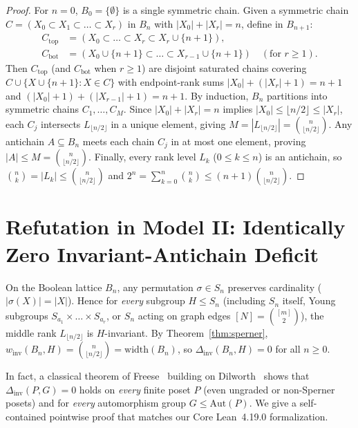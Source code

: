 \documentclass[11pt,a4paper]{article}
\theoremstyle{definition}
\newcommand{\Bn}{B_n}
\newcommand{\Sn}{S_n}
\newcommand{\Aut}{\mathrm{Aut}}
\newcommand{\width}{\mathrm{width}}
\newcommand{\winv}{w_{\mathrm{inv}}}
\newcommand{\Dinv}{\Delta_{\mathrm{inv}}}
\begin{document}
\begin{proof}
For $n = 0$, $B_0 = \{\emptyset\}$ is a single symmetric chain. Given a symmetric chain $C = (X_0 \subset X_1 \subset \dots \subset X_r)$ in $\Bn$ with $|X_0| + |X_r| = n$, define in $B_{n+1}$:
\begin{align*}
  C_{\mathrm{top}} &= (X_0 \subset \dots \subset X_r \subset X_r \cup \{n+1\}), \\
  C_{\mathrm{bot}} &= (X_0 \cup \{n+1\} \subset \dots \subset X_{r-1} \cup \{n+1\}) \quad (\text{for } r \ge 1).
\end{align*}
Then $C_{\mathrm{top}}$ (and $C_{\mathrm{bot}}$ when $r \ge 1$) are disjoint saturated chains covering $C \cup \{X \cup \{n+1\} : X \in C\}$ with endpoint-rank sums $|X_0| + (|X_r|+1) = n+1$ and $(|X_0|+1) + (|X_{r-1}|+1) = n+1$. By induction, $\Bn$ partitions into symmetric chains $C_1, \dots, C_M$. Since $|X_0| + |X_r| = n$ implies $|X_0| \le \lfloor n/2 \rfloor \le |X_r|$, each $C_j$ intersects $L_{\lfloor n/2 \rfloor}$ in a unique element, giving $M = |L_{\lfloor n/2 \rfloor}| = \binom{n}{\lfloor n/2 \rfloor}$. Any antichain $A \subseteq \Bn$ meets each chain $C_j$ in at most one element, proving $|A| \le M = \binom{n}{\lfloor n/2 \rfloor}$. Finally, every rank level $L_k$ ($0 \le k \le n$) is an antichain, so $\binom{n}{k} = |L_k| \le \binom{n}{\lfloor n/2 \rfloor}$ and $2^n = \sum_{k=0}^n \binom{n}{k} \le (n+1)\binom{n}{\lfloor n/2 \rfloor}$.
\end{proof}

\section{Refutation in Model II: Identically Zero Invariant-Antichain Deficit}

On the Boolean lattice $\Bn$, any permutation $\sigma \in \Sn$ preserves cardinality ($|\sigma(X)| = |X|$). Hence for \emph{every} subgroup $H \le \Sn$ (including $\Sn$ itself, Young subgroups $S_{a_1} \times \dots \times S_{a_r}$, or $\Sn$ acting on graph edges $[N] = \binom{[m]}{2}$), the middle rank $L_{\lfloor n/2 \rfloor}$ is $H$-invariant. By Theorem~\ref{thm:sperner}, $\winv(\Bn, H) = \binom{n}{\lfloor n/2 \rfloor} = \width(\Bn)$, so $\Dinv(\Bn, H) = 0$ for all $n \ge 0$.

In fact, a classical theorem of Freese~\cite{Freese1974} building on Dilworth~\cite{Dilworth1960} shows that $\Dinv(P, G) = 0$ holds on \emph{every} finite poset $P$ (even ungraded or non-Sperner posets) and for \emph{every} automorphism group $G \le \Aut(P)$. We give a self-contained pointwise proof that matches our Core Lean~4.19.0 formalization.
\end{document}
